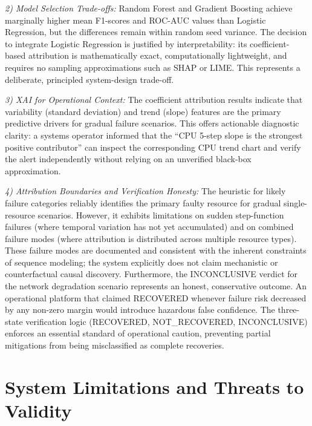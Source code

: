 \documentclass[conference]{IEEEtran}
\begin{document}
\textit{2) Model Selection Trade-offs:} Random Forest and Gradient Boosting achieve marginally higher mean F1-scores and ROC-AUC values than Logistic Regression, but the differences remain within random seed variance. The decision to integrate Logistic Regression is justified by interpretability: its coefficient-based attribution is mathematically exact, computationally lightweight, and requires no sampling approximations such as SHAP or LIME. This represents a deliberate, principled system-design trade-off.

\textit{3) XAI for Operational Context:} The coefficient attribution results indicate that variability (standard deviation) and trend (slope) features are the primary predictive drivers for gradual failure scenarios. This offers actionable diagnostic clarity: a systems operator informed that the ``CPU 5-step slope is the strongest positive contributor'' can inspect the corresponding CPU trend chart and verify the alert independently without relying on an unverified black-box approximation.

\textit{4) Attribution Boundaries and Verification Honesty:} The heuristic for likely failure categories reliably identifies the primary faulty resource for gradual single-resource scenarios. However, it exhibits limitations on sudden step-function failures (where temporal variation has not yet accumulated) and on combined failure modes (where attribution is distributed across multiple resource types). These failure modes are documented and consistent with the inherent constraints of sequence modeling; the system explicitly does not claim mechanistic or counterfactual causal discovery. Furthermore, the INCONCLUSIVE verdict for the network degradation scenario represents an honest, conservative outcome. An operational platform that claimed RECOVERED whenever failure risk decreased by any non-zero margin would introduce hazardous false confidence. The three-state verification logic (RECOVERED, NOT\_RECOVERED, INCONCLUSIVE) enforces an essential standard of operational caution, preventing partial mitigations from being misclassified as complete recoveries.

\section{System Limitations and Threats to Validity}
\end{document}
